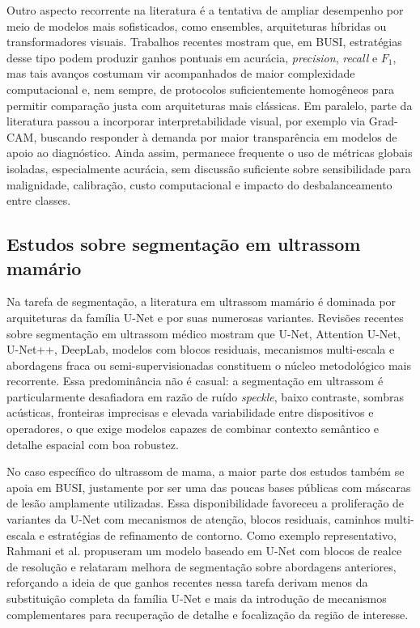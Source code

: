 \documentclass[tcc,capa]{texufpel}
\begin{document}
Outro aspecto recorrente na literatura é a tentativa de ampliar desempenho por meio de modelos mais sofisticados, como ensembles, arquiteturas híbridas ou transformadores visuais. Trabalhos recentes mostram que, em BUSI, estratégias desse tipo podem produzir ganhos pontuais em acurácia, \textit{precision}, \textit{recall} e \(F_1\), mas tais avanços costumam vir acompanhados de maior complexidade computacional e, nem sempre, de protocolos suficientemente homogêneos para permitir comparação justa com arquiteturas mais clássicas. Em paralelo, parte da literatura passou a incorporar interpretabilidade visual, por exemplo via Grad-CAM, buscando responder à demanda por maior transparência em modelos de apoio ao diagnóstico. Ainda assim, permanece frequente o uso de métricas globais isoladas, especialmente acurácia, sem discussão suficiente sobre sensibilidade para malignidade, calibração, custo computacional e impacto do desbalanceamento entre classes. \cite{Latha2024EfficientNetXAI,Dan2024}

\subsection{Estudos sobre segmentação em ultrassom mamário}

Na tarefa de segmentação, a literatura em ultrassom mamário é dominada por arquiteturas da família U-Net e por suas numerosas variantes. Revisões recentes sobre segmentação em ultrassom médico mostram que U-Net, Attention U-Net, U-Net++, DeepLab, modelos com blocos residuais, mecanismos multi-escala e abordagens fraca ou semi-supervisionadas constituem o núcleo metodológico mais recorrente. Essa predominância não é casual: a segmentação em ultrassom é particularmente desafiadora em razão de ruído \textit{speckle}, baixo contraste, sombras acústicas, fronteiras imprecisas e elevada variabilidade entre dispositivos e operadores, o que exige modelos capazes de combinar contexto semântico e detalhe espacial com boa robustez. \cite{Xiao2025UltrasoundSegReview,Rayed2024SegSurvey}

No caso específico do ultrassom de mama, a maior parte dos estudos também se apoia em BUSI, justamente por ser uma das poucas bases públicas com máscaras de lesão amplamente utilizadas. Essa disponibilidade favoreceu a proliferação de variantes da U-Net com mecanismos de atenção, blocos residuais, caminhos multi-escala e estratégias de refinamento de contorno. Como exemplo representativo, Rahmani et al. propuseram um modelo baseado em U-Net com blocos de realce de resolução e relataram melhora de segmentação sobre abordagens anteriores, reforçando a ideia de que ganhos recentes nessa tarefa derivam menos da substituição completa da família U-Net e mais da introdução de mecanismos complementares para recuperação de detalhe e focalização da região de interesse. \cite{Rahmani2024,AlDhabyani2020}
\end{document}
